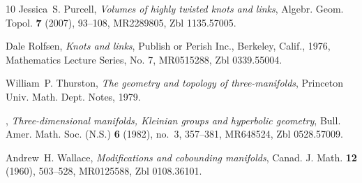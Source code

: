 \documentclass[11pt]{amsart}
\theoremstyle{plain}
\theoremstyle{definition}
\begin{document}
\begin{thebibliography}{10}
Jessica~S. Purcell, \emph{{Volumes of highly twisted knots and links}}, Algebr.
  Geom. Topol. \textbf{7} (2007), 93--108, MR2289805, Zbl 1135.57005.

Dale Rolfsen, \emph{Knots and links}, Publish or Perish Inc., Berkeley, Calif.,
  1976, Mathematics Lecture Series, No. 7, MR0515288, Zbl 0339.55004.

William~P. Thurston, \emph{The geometry and topology of three-manifolds},
  Princeton Univ. Math. Dept. Notes, 1979.

\bysame, \emph{Three-dimensional manifolds, {K}leinian groups and hyperbolic
  geometry}, Bull. Amer. Math. Soc. (N.S.) \textbf{6} (1982), no.~3,
357--381, MR648524, Zbl 0528.57009.

Andrew~H. Wallace, \emph{Modifications and cobounding manifolds}, Canad. J.
  Math. \textbf{12} (1960), 503--528, MR0125588, Zbl 0108.36101.

\end{thebibliography}
\end{document}
